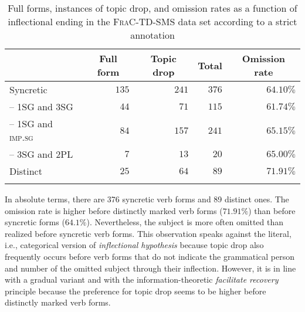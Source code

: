 \begin{table}
\centering
\caption{Full forms, instances of topic drop, and omission rates as a function of inflectional ending in the \textsc{FraC-TD-SMS} data set according to a strict annotation}
\begin{tabular}{lrrrr}
\lsptoprule
\multicolumn{1}{c}{Verb form} & \multicolumn{1}{c}{Full form} & \multicolumn{1}{c}{Topic drop} & \multicolumn{1}{c}{Total} & \multicolumn{1}{c}{Omission rate} \\
\midrule
Syncretic & $135$ & $241$ & $376$ & $64.10\%$\\
-- 1SG and 3SG & $44$ & $71$ & $115$ & $61.74\%$\\
-- 1SG and \textsc{imp.sg} & $84$ & $157$ & $241$ & $65.15\%$\\
-- 3SG and 2PL & $7$ & $13$ & $20$ & $65.00\%$\\
Distinct & $25$ & $64$ & $89$ & $71.91\%$ \\
\lspbottomrule
\end{tabular}
\label{tab:frac.inflection}
\end{table}

In absolute terms, there are 376 syncretic verb forms and 89 distinct ones.
The omission rate is higher before distinctly marked verb forms ($71.91\%$) than before syncretic forms ($64.1\%$).
Nevertheless, the subject is more often omitted than realized before syncretic verb forms.
This observation speaks against the literal, i.e., categorical version of  \textit{inflectional hypothesis} because topic drop also frequently occurs before verb forms that do not indicate the grammatical person and number of the omitted subject through their inflection.
However, it is in line with a gradual variant and with the information-theoretic \textit{facilitate recovery} principle  because the preference for topic drop seems to be higher before distinctly marked verb forms.

